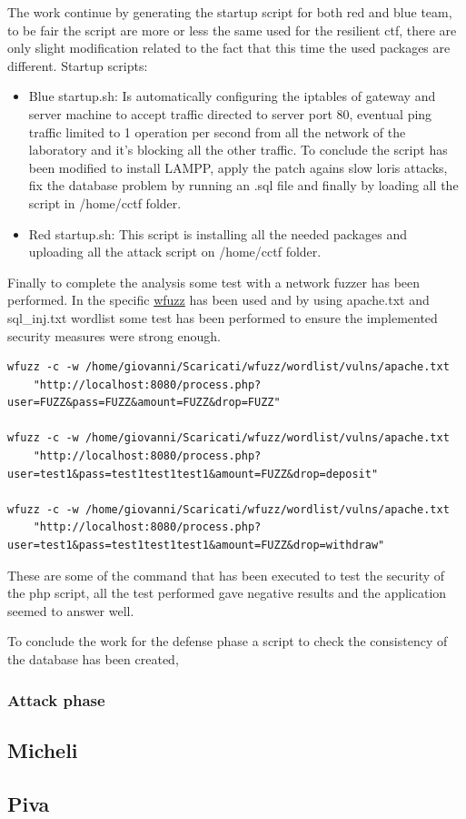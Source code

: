 \documentclass[14pt]{article}
\begin{document}
The work continue by generating the startup script for both red and blue team, to be fair the script are more or less the same used for the resilient ctf, there are only slight modification related to the fact that this time the used packages are different.
Startup scripts:
\begin{itemize}
	\item Blue startup.sh: Is automatically configuring the iptables of gateway and server machine to accept traffic directed to server port 80, eventual ping traffic limited to 1 operation per second from all the network of the laboratory and it's blocking all the other traffic. To conclude the script has been modified to install LAMPP, apply the patch agains slow loris attacks, fix the database problem by running an .sql file and finally by loading all the script in /home/cctf folder.
	
	\item Red startup.sh: This script is installing all the needed packages and uploading all the attack script on /home/cctf folder.
\end{itemize} 

Finally to complete the analysis some test with a network fuzzer has been performed. In the specific \href{https://github.com/xmendez/wfuzz}{wfuzz} has been used and by using apache.txt and sql\_inj.txt wordlist some test has been performed to ensure the implemented security measures were strong enough. 
\begin{verbatim}
wfuzz -c -w /home/giovanni/Scaricati/wfuzz/wordlist/vulns/apache.txt 
	"http://localhost:8080/process.php?user=FUZZ&pass=FUZZ&amount=FUZZ&drop=FUZZ"

wfuzz -c -w /home/giovanni/Scaricati/wfuzz/wordlist/vulns/apache.txt 
	"http://localhost:8080/process.php?user=test1&pass=test1test1test1&amount=FUZZ&drop=deposit"

wfuzz -c -w /home/giovanni/Scaricati/wfuzz/wordlist/vulns/apache.txt 
	"http://localhost:8080/process.php?user=test1&pass=test1test1test1&amount=FUZZ&drop=withdraw"
\end{verbatim}
These are some of the command that has been executed to test the security of the php script, all the test performed gave negative results and the application seemed to answer well.

To conclude the work for the defense phase a script to check the consistency of the database has been created, 

\subsubsection{Attack phase}

\subsection{Micheli}

\subsection{Piva}
\end{document}
